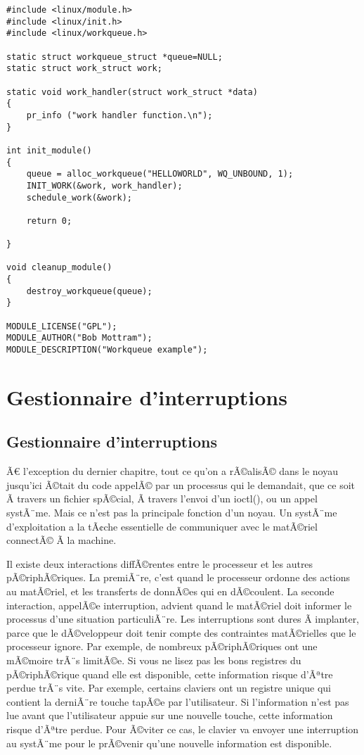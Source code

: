 \documentclass[11pt]{article}
\begin{document}
\begin{verbatim}
#include <linux/module.h>
#include <linux/init.h>
#include <linux/workqueue.h>

static struct workqueue_struct *queue=NULL;
static struct work_struct work;

static void work_handler(struct work_struct *data)
{
    pr_info ("work handler function.\n");
}

int init_module()
{
    queue = alloc_workqueue("HELLOWORLD", WQ_UNBOUND, 1);
    INIT_WORK(&work, work_handler);
    schedule_work(&work);

    return 0;

}

void cleanup_module()
{
    destroy_workqueue(queue);
}

MODULE_LICENSE("GPL");
MODULE_AUTHOR("Bob Mottram");
MODULE_DESCRIPTION("Workqueue example");
\end{verbatim}

\section*{Gestionnaire d'interruptions}
\label{sec-15}

\subsection*{Gestionnaire d'interruptions}
\label{sec-15-1}
Ã€ l'exception du dernier chapitre, tout ce qu'on a rÃ©alisÃ© dans le noyau jusqu'ici Ã©tait du code appelÃ© par un processus qui le demandait, que ce soit Ã  travers un fichier spÃ©cial, Ã  travers l'envoi d'un ioctl(), ou un appel systÃ¨me. Mais ce n'est pas la principale fonction d'un noyau. Un systÃ¨me d'exploitation a la tÃ¢che essentielle de communiquer avec le matÃ©riel connectÃ© Ã  la machine.

Il existe deux interactions diffÃ©rentes entre le processeur et les autres pÃ©riphÃ©riques. La premiÃ¨re, c'est quand le processeur ordonne des actions au matÃ©riel, et les transferts de donnÃ©es qui en dÃ©coulent. La seconde interaction, appelÃ©e interruption, advient quand le matÃ©riel doit informer le processus d'une situation particuliÃ¨re. Les interruptions sont dures Ã  implanter, parce que le dÃ©veloppeur doit tenir compte des contraintes matÃ©rielles que le processeur ignore. Par exemple, de nombreux pÃ©riphÃ©riques ont une mÃ©moire trÃ¨s limitÃ©e. Si vous ne lisez pas les bons registres du pÃ©riphÃ©rique quand elle est disponible, cette information risque d'Ãªtre perdue trÃ¨s vite. Par exemple, certains claviers ont un registre unique qui contient la derniÃ¨re touche tapÃ©e par l'utilisateur. Si l'information n'est pas lue avant que l'utilisateur appuie sur une nouvelle touche, cette information risque d'Ãªtre perdue. Pour Ã©viter ce cas, le clavier va envoyer une interruption au systÃ¨me pour le prÃ©venir qu'une nouvelle information est disponible.
\end{document}

